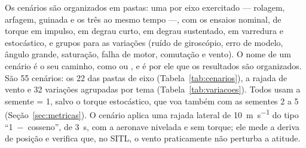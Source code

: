 Os cenários são organizados em pastas: uma por eixo exercitado --- rolagem,
arfagem, guinada e os três ao mesmo tempo ---, com os ensaios nominal, de
torque em impulso, em degrau curto, em degrau sustentado, em varredura e
estocástico, e grupos para as variações (ruído de giroscópio, erro de
modelo, ângulo grande, saturação, falha de motor, comutação e vento). O nome
de um cenário é o seu caminho, como  ou
, e é por ele que os resultados são
organizados. São 55 cenários: os 22 das pastas de eixo
(Tabela~\ref{tab:cenarios}), a rajada de vento e 32 variações agrupadas por
tema (Tabela~\ref{tab:variacoes}). Todos usam a semente
 = 1, salvo o torque estocástico, que voa também com as
sementes 2 a 5 (Seção~\ref{sec:metricas}). O cenário  aplica uma rajada
lateral de \SI{10}{\metre\per\second} do tipo ``1~$-$~cosseno'', de
\SI{3}{\second}, com a aeronave nivelada e sem torque; ele mede a deriva de
posição e verifica que, no SITL, o vento praticamente não perturba a
atitude.


